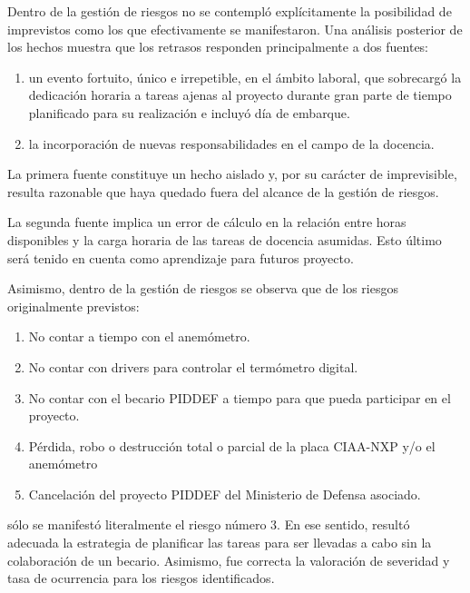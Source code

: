 
Dentro de la gestión de riesgos no se contempló explícitamente la posibilidad de imprevistos como los que efectivamente se manifestaron.  Una análisis posterior de los hechos muestra que los retrasos responden principalmente a dos fuentes:

\begin{enumerate}
	\item un evento fortuito, único e irrepetible, en el ámbito laboral, que sobrecargó la dedicación horaria a tareas ajenas al proyecto durante gran parte de tiempo planificado para su realización e incluyó día de embarque.
	\item la incorporación de nuevas responsabilidades en el campo de la docencia.
\end{enumerate}

La primera fuente constituye un hecho aislado y, por su carácter de imprevisible, resulta razonable que haya quedado fuera del alcance de la gestión de riesgos.  

La segunda fuente implica un error de cálculo en la relación entre horas disponibles y la carga horaria de las tareas de docencia asumidas.  Esto último será tenido en cuenta como aprendizaje para futuros proyecto.

Asimismo, dentro de la gestión de riesgos se observa que de los riesgos originalmente previstos:

\begin{enumerate}
	\item No contar a tiempo con el anemómetro.
	\item No contar con drivers para controlar el termómetro digital.
	\item No contar con el becario PIDDEF a tiempo para que pueda participar en el proyecto.
	\item Pérdida, robo o destrucción total o parcial de la placa CIAA-NXP y/o el anemómetro
	\item Cancelación del proyecto PIDDEF del Ministerio de Defensa asociado.
\end{enumerate}

\noindent sólo se manifestó literalmente el riesgo número 3. En ese sentido, resultó adecuada la estrategia de planificar las tareas para ser llevadas a cabo sin la colaboración de un becario.  Asimismo, fue correcta la valoración de severidad y tasa de ocurrencia para los riesgos identificados.


